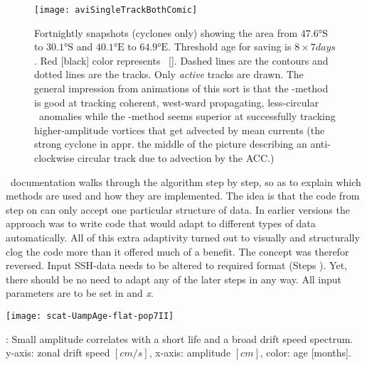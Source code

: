 \label{chap:algorithm}

\begin{fullwidth}
\begin{figure}
\texttt{[image: aviSingleTrackBothComic]}
\caption
{
Fortnightly \aviII snapshots (cyclones only) showing the area from $\ang{47.6} \mathrm{S}$ to $\ang{30.1} \mathrm{S}$ and $\ang{40.1} \mathrm{E}$ to $\ang{64.9} \mathrm{E}$. Threshold age for saving is $8\times 7  \si{days}$. Red [black] color represents \MI~[\MII]. Dashed lines are the contours and dotted lines are the tracks. Only \textit{active} tracks are drawn. The general impression from animations of this sort is that the \MI-method is good at tracking coherent, west-ward propagating, less-circular \SSH~anomalies while the \MII-method seems superior at successfully tracking higher-amplitude vortices that get advected by mean currents (\eg the strong cyclone in appr. the middle of the picture describing an anti-clockwise circular track due to advection by the ACC.)
}
\label{fig:aviSingleTrackBothComic}
\end{figure}
\end{fullwidth}
~documentation walks through the algorithm step by step, so as to explain
which methods are used and how they are implemented.
The idea is that the code from step  on can only accept one particular structure of data. In earlier versions the approach was to write code
that would adapt to different types of data automatically. All of this extra
adaptivity turned out to visually and structurally clog the code more than it
offered much of a benefit. The concept was therefor reversed. Input SSH-data needs to be altered to required format (Steps ). Yet, there should be no need to adapt any of the later steps in any way.
All input parameters are to be set in  and \textit{x}.

\begin{marginfigure}
		\texttt{[image: scat-UampAge-flat-pop7II]}
		\caption{\popSevenII: Small amplitude correlates with a short life and a broad drift speed spectrum. y-axis: zonal drift speed $[cm/s]$, x-axis: amplitude $[cm]$, color: age [months].}
		\label{fig:scat-UampAge-flat-pop7II}
\end{marginfigure}
